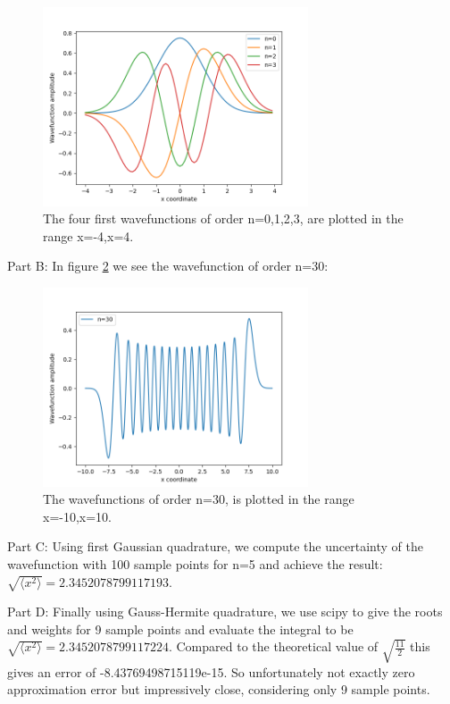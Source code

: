 \documentclass[11pt]{article}
\begin{document}
\begin{figure}[!htbp]
    \centering
    \includegraphics[width=0.7\textwidth]{Wavefunctions_n1-3.png}
    \caption{The four first wavefunctions of order n=0,1,2,3, are plotted in the range x=-4,x=4.}
    \label{x4}
\end{figure}

Part B: In figure \ref{partb} we see the wavefunction of order n=30:
\begin{figure}[!htbp]
    \centering
    \includegraphics[width=0.7\textwidth]{Wavefunctions_n30.png}
    \caption{The wavefunctions of order n=30, is plotted in the range x=-10,x=10.}
    \label{partb}
\end{figure}

Part C: Using first Gaussian quadrature, we compute the uncertainty of the wavefunction with 100 sample points for n=5 and achieve the result: $\sqrt{\langle x^2\rangle }=2.3452078799117193$. 

Part D: Finally using Gauss-Hermite quadrature, we use scipy to give the roots and weights for 9 sample points and evaluate the integral to be $\sqrt{\langle x^2\rangle}= 2.3452078799117224$. Compared to the theoretical value of $\sqrt{\frac{11}{2}} $ this gives an error of -8.43769498715119e-15. So unfortunately not exactly zero approximation error but impressively close, considering only 9 sample points.
\end{document}
